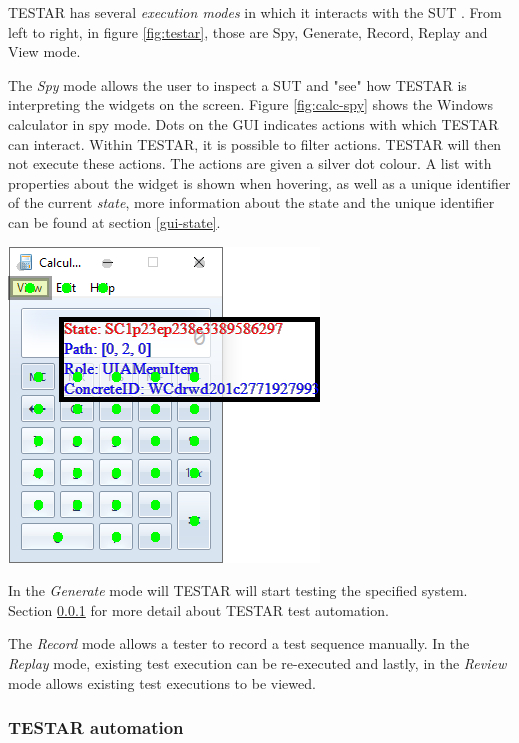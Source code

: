 TESTAR has several \emph{execution modes} in which it interacts with the SUT \cite{testar-manual}. From left to right, in figure \ref{fig:testar}, those are Spy, Generate, Record, Replay and View mode. 

The \emph{Spy} mode allows the user to inspect a SUT and "see" how TESTAR is interpreting the widgets on the screen. Figure \ref{fig:calc-spy} shows the Windows calculator in spy mode. Dots on the GUI indicates actions with which TESTAR can interact. Within TESTAR, it is possible to filter actions. TESTAR will then not execute these actions. The actions are given a silver dot colour. A list with properties about the widget is shown when hovering, as well as a unique identifier of the current \emph{state}, more information about the state and the unique identifier can be found at section \ref{gui-state}.\par

\includegraphics{pics/calc-state.png}
\label{fig:calc-spy}

In the \emph{Generate} mode will TESTAR will start testing the specified system. Section \ref{testar-testauto} for more detail about TESTAR test automation. \par

The \emph{Record} mode allows a tester to record a test sequence manually. In the \emph{Replay} mode, existing test execution can be re-executed and lastly, in the \emph{Review} mode allows existing test executions to be viewed. \par

\subsubsection{TESTAR automation} \label{testar-testauto}
    
